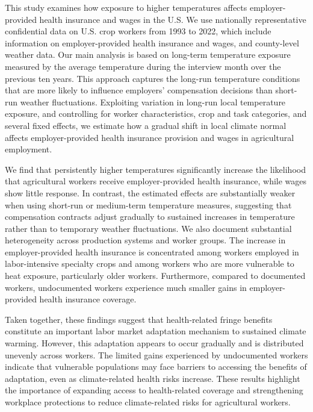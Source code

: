 \documentclass[12pt]{article}
\begin{document}
This study examines how exposure to higher temperatures affects employer-provided health insurance and wages in the U.S. We use nationally representative confidential data on U.S. crop workers from 1993 to 2022, which include information on employer-provided health insurance and wages, and county-level weather data. Our main analysis is based on long-term temperature exposure measured by the average temperature during the interview month over the previous ten years. This approach captures the long-run temperature conditions that are more likely to influence employers’ compensation decisions than short-run weather fluctuations. Exploiting variation in long-run local temperature exposure, and controlling for worker characteristics, crop and task categories, and several fixed effects, we estimate how a gradual shift in local climate normal affects employer-provided health insurance provision and wages in agricultural employment.

We find that persistently higher temperatures significantly increase the likelihood that agricultural workers receive employer-provided health insurance, while wages show little response. In contrast, the estimated effects are substantially weaker when using short-run or medium-term temperature measures, suggesting that compensation contracts adjust gradually to sustained increases in temperature rather than to temporary weather fluctuations. We also document substantial heterogeneity across production systems and worker groups. The increase in employer-provided health insurance is concentrated among workers employed in labor-intensive specialty crops and among workers who are more vulnerable to heat exposure, particularly older workers. Furthermore, compared to documented workers, undocumented workers experience much smaller gains in employer-provided health insurance coverage.

Taken together, these findings suggest that health-related fringe benefits constitute an important labor market adaptation mechanism to sustained climate warming. However, this adaptation appears to occur gradually and is distributed unevenly across workers. The limited gains experienced by undocumented workers indicate that vulnerable populations may face barriers to accessing the benefits of adaptation, even as climate-related health risks increase. These results highlight the importance of expanding access to health-related coverage and strengthening workplace protections to reduce climate-related risks for agricultural workers.
\end{document}
